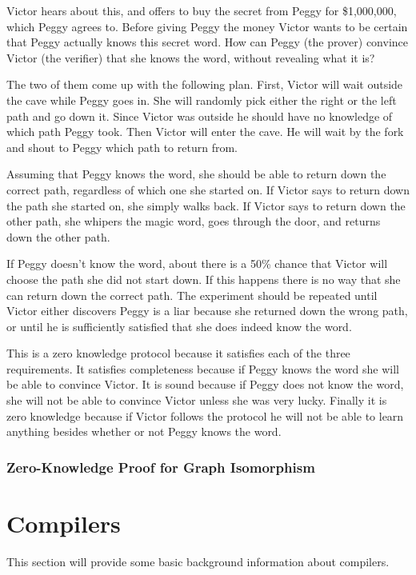 \documentclass{sig-alternate}
\begin{document}
	Victor hears about this, and offers to buy the secret from Peggy for
	\$1,000,000, which Peggy agrees to. Before giving Peggy the money Victor
	wants to be certain that Peggy actually knows this secret word. How can
	Peggy (the prover) convince Victor (the verifier) that she knows the
	word, without revealing what it is?

	The two of them come up with the following plan. First, Victor will wait
	outside the cave while Peggy goes in. She will randomly pick either the
	right or the left path and go down it. Since Victor was outside he
	should have no knowledge of which path Peggy took. Then Victor will
	enter the cave. He will wait by the fork and shout to Peggy which
	path to return from. 
	
	Assuming that Peggy knows the word, she should be able to return down
	the correct path, regardless of which one she started on. If Victor 
	says to	return down the path she started on, she simply walks back. 
	If Victor says to return down the other path, she whipers the magic
	word, goes through the door, and returns down the other path.

	If Peggy doesn't know the word, about there is a 50\% chance that Victor
	will choose the path she did not start down. If this happens there is
	no way that she can return down the correct path. The experiment should
	be repeated until Victor either discovers Peggy is a liar because she
	returned down the wrong path, or until he is sufficiently satisfied
	that she does indeed know the word.

	This is a zero knowledge protocol because it satisfies each of the three
	requirements. It satisfies completeness because	if Peggy knows the word
	she will be able to convince Victor. It is sound because if Peggy does not 
	know the word, she will not be able to convince Victor unless she was very
	lucky. Finally it is zero knowledge because if Victor follows the protocol
	he will not be able to learn anything besides whether or not Peggy knows 
	the word.

	\subsubsection{Zero-Knowledge Proof for Graph Isomorphism}

\section{Compilers}
	This section will provide some basic background information about compilers.
\end{document}
